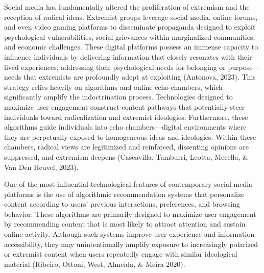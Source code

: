\documentclass{NSP1}
\begin{document}
\par\medskip{}\smallskip

Social media has fundamentally altered the proliferation of extremism and the reception of radical ideas. Extremist groups leverage social media, online forums, and even video gaming platforms to disseminate propaganda designed to exploit psychological vulnerabilities, social grievances within marginalized communities, and economic challenges. These digital platforms possess an immense capacity to influence individuals by delivering information that closely resonates with their lived experiences, addressing their psychological needs for belonging or purpose—needs that extremists are profoundly adept at exploiting (Antonova, 2023). This strategy relies heavily on algorithms and online echo chambers, which significantly amplify the indoctrination process. Technologies designed to maximize user engagement construct content pathways that potentially steer individuals toward radicalization and extremist ideologies. Furthermore, these algorithms guide individuals into echo chambers—digital environments where they are perpetually exposed to homogeneous ideas and ideologies. Within these chambers, radical views are legitimized and reinforced, dissenting opinions are suppressed, and extremism deepens (Cascavilla, Tamburri, Leotta, Mecella, \& Van Den Heuvel, 2023).

\par\medskip{}\smallskip

One of the most influential technological features of contemporary social media platforms is the use of algorithmic recommendation systems that personalize content according to users' previous interactions, preferences, and browsing behavior. These algorithms are primarily designed to maximize user engagement by recommending content that is most likely to attract attention and sustain online activity. Although such systems improve user experience and information accessibility, they may unintentionally amplify exposure to increasingly polarized or extremist content when users repeatedly engage with similar ideological material (Ribeiro, Ottoni, West, Almeida, \& Meira 2020).
\end{document}
